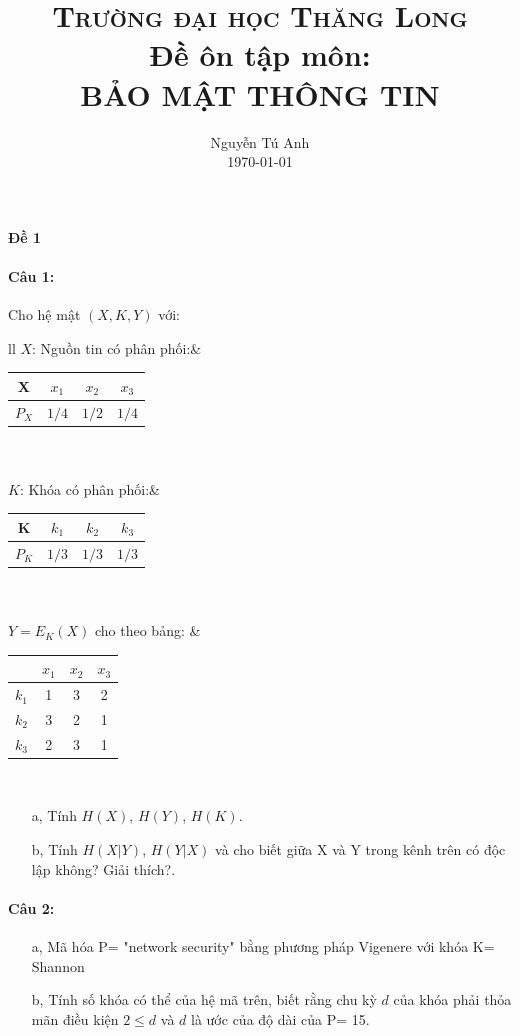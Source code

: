\documentclass[paper=a4, fontsize=11pt]{scrartcl}
\title{
	\usefont{OT1}{bch}{b}{n}
	\normalfont \normalsize \textsc{Trường đại học Thăng Long} \\
	\Large Đề ôn tập môn: \\
	\Large BẢO MẬT THÔNG TIN
}
\author{
	\normalfont 								\normalsize
	Nguyễn Tú Anh\\[-3pt]		\normalsize
	\today
}
\date{}
\numberwithin{equation}{section}		%
\numberwithin{figure}{section}			%
\numberwithin{table}{section}				%
\begin{document}
	\maketitle
	\newpage
	\textbf{Đề 1}
	
	\paragraph{Câu 1:} Cho hệ mật $(X, K, Y)$ với:\\
	\begin{tabular}{ll}
		$X$: Nguồn tin có phân phối:& 
		\begin{tabular}{|c|c|c|c|}
			\hline 
			X     & $x_1$ & $x_2$ & $x_3$\\
			\hline 
			$P_X$ & $1/4$ & $1/2$ & $1/4$\\
			\hline 
		\end{tabular} \\\\
		$K$: Khóa có phân phối:& 
		\begin{tabular}{|c|c|c|c|}
			\hline 
			K     & $k_1$ & $k_2$ & $k_3$\\
			\hline 
			$P_K$ & $1/3$ & $1/3$ & $1/3$\\
			\hline 
		\end{tabular} \\\\ 
		$Y= E_K(X)$ cho theo bảng:	
		&
		\begin{tabular}{|c|c|c|c|}
			\hline 
			      & $x_1$ & $x_2$ & $x_3$\\
			\hline 
			$k_1$ & 1      & 3    & 2    \\
			\hline 
			$k_2$ & 3      & 2    & 1    \\
			\hline 
			$k_3$ & 2      & 3    & 1   \\
			\hline 
		\end{tabular}\\
	\end{tabular} 

	\begin{itemize}
		\item[a,] Tính $H(X)$, $H(Y)$, $H(K)$.
		\item[b,] Tính $H(X|Y)$, $H(Y|X)$ và cho biết giữa X và Y trong kênh trên có độc lập không? Giải thích?.
	\end{itemize}	
	
	\paragraph{Câu 2:}
	\begin{itemize}
		\item[a,] Mã hóa P= "network security" bằng phương pháp Vigenere với khóa K= Shannon
		\item[b,] Tính số khóa có thể của hệ mã trên, biết rằng chu kỳ $d$ của khóa phải thỏa mãn điều kiện $2 \leq d$ và $d$ là ước của độ dài của P= 15.
	\end{itemize}
\end{document}
